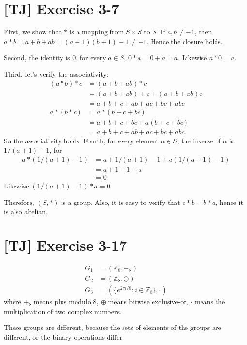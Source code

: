 \documentclass[a4paper,11pt,twocolumn]{article}
\begin{document}
  \section{[TJ] Exercise 3-7}
  First, we show that $*$ is a mapping from $S \times S$ to $S$. If $a, b \neq -1$, then $a*b = a+b+ab = (a+1)(b+1)-1 \neq -1$. Hence the closure holds. \par
  Second, the identity is $0$, for every $a \in S$, $0 * a = 0 + a = a$. Likewise $a * 0 = a$. \par
  Third, let's verify the associativity:
  \begin{align*}
    (a*b)*c &= (a + b + ab)*c \\
     &= (a+b+ab) + c + (a+b+ab)c \\
     &= a + b + c + ab + ac + bc + abc \\
     a*(b*c) &= a*(b+c+bc) \\
     &= a + b + c + bc + a(b+c+bc) \\
     &= a + b + c + ab + ac + bc + abc
  \end{align*}
  So the associativity holds.
  Fourth, for every element $a \in S$, the inverse of $a$ is $1/(a+1) - 1$, for
  \begin{align*}
    a*(1/(a+1) - 1) &= a + 1/(a+1) - 1 + a(1/(a+1) - 1) \\
    &= a + 1 - 1 - a \\
    &= 0
  \end{align*}
  Likewise $(1/(a+1)-1)*a = 0$. \par
  Therefore, $(S, *)$ is a group. Also, it is easy to verify that $a * b = b * a$, hence it is also abelian.

  \section{[TJ] Exercise 3-17}
  \begin{align*}
    G_1 &= (\mathbb{Z}_8, +_8) \\
    G_2 &= (\mathbb{Z}_8, \oplus) \\
    G_3 &= (\{e^{2 \pi i / 8} : i \in \mathbb{Z}_8\}, \cdot)
  \end{align*}
  where $+_8$ means plus modulo 8, $\oplus$ means bitwise exclusive-or, $\cdot$ means the multiplication of two complex numbers. \par
  These groups are different, because the sets of elements of the groups are different, or the binary operations differ.
\end{document}
